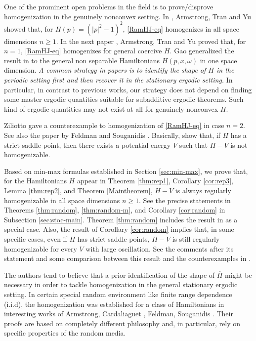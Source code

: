 \documentclass[12pt,reqno]{amsart}
\theoremstyle{plain}
\theoremstyle{remark}
\numberwithin{equation}{section}
\newcommand{\om}{\omega}
\newcommand{\ol}{\overline}
\begin{document}
One of the prominent  open problems in the field is to prove/disprove homogenization in the genuinely nonconvex setting. 
In \cite{ATY1}, Armstrong, Tran and Yu showed that, for $H(p)=(|p|^2-1)^2$, \eqref{RamHJ-eq}
homogenizes  in all space dimensions $n\geq 1$. 
In the next paper \cite{ATY2},
Armstrong, Tran and Yu proved that, for $n=1$,  \eqref{RamHJ-eq} homogenizes for general coercive $H$. 
Gao \cite{Gao} generalized the result in \cite{ATY2} to the general non separable Hamiltonians $H(p,x,\om)$ in one space dimension. 
{\it A common strategy  in  papers \cite{ATY1, ATY2,  Gao} is to identify the shape of $\ol H$  in the periodic setting first and then recover it in the stationary ergodic setting. } In particular,  in contrast to previous works,  our strategy does not depend on finding some master ergodic quantities suitable for subadditive ergodic theorems.  Such kind of ergodic quantities may not exist at all for  genuinely nonconvex $H$.  

\smallskip

Ziliotto \cite{Zi} gave a counterexample to homogenization of \eqref{RamHJ-eq} in case $n=2$.
See also the paper by Feldman and Souganidis \cite{Fe-Sou}.
Basically, \cite{Zi,Fe-Sou} show that, if $H$ has a strict saddle point, then there exists a potential energy $V$ such that
$H-V$ is not homogenizable.
\smallskip

Based on min-max formulas established in Section \ref{sec:min-max},  we prove that, for the Hamiltonians $H$ appear in Theorem \ref{thm:rep1}, Corollary \ref{cor:rep3},
 Lemma \ref{thm:rep2}, and Theorem \ref{Maintheorem}, $H-V$ is always regularly homogenizable in all space dimensions $n \geq 1$. See the precise statements in Theorems \ref{thm:random}, \ref{thm:random-m}, and Corollary \ref{cor:random} in Subsection \ref{sec:stoc-main}.
Theorem \ref{thm:random} includes the result in \cite{ATY1} as a special case.  Also, 
the result of Corollary \ref{cor:random}  implies that, in some specific cases,
even if $H$ has strict saddle points, $H-V$ is still regularly homogenizable  for every $V$ with large oscillation. See the comments after its statement and some comparison between this result and the counterexamples in \cite{Zi, Fe-Sou}.  

\smallskip

The authors tend to believe that a prior identification of the shape of $\ol H$ might be necessary in order to tackle homogenization in the general stationary ergodic setting.   In certain special random environment like  finite range dependence (i.i.d),  the homogenization was established for a class of Hamiltonians in  interesting works of Armstrong, Cardaliaguet \cite{AC}, Feldman, Souganidis \cite{Fe-Sou}.  Their proofs are based on completely different philosophy and, in particular,  rely on specific properties of the random media.  
\end{document}
